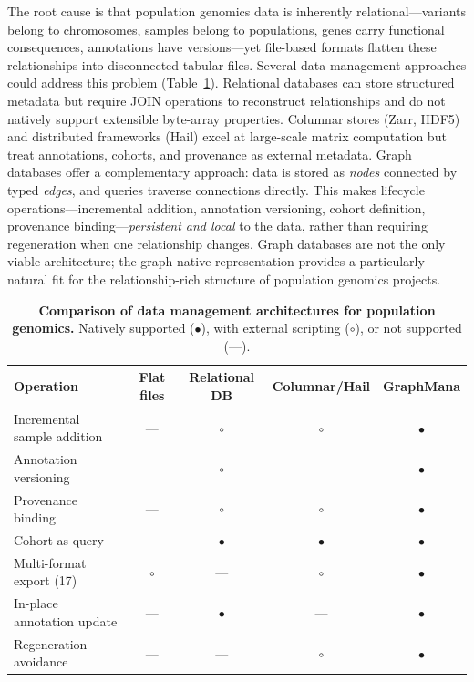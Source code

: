\documentclass[pdflatex,sn-nature]{sn-jnl}
\begin{document}
The root cause is that population genomics data is inherently relational---variants belong to chromosomes, samples belong to populations, genes carry functional consequences, annotations have versions---yet file-based formats flatten these relationships into disconnected tabular files. Several data management approaches could address this problem (Table~\ref{tab:architectures}). Relational databases can store structured metadata but require JOIN operations to reconstruct relationships and do not natively support extensible byte-array properties. Columnar stores (Zarr, HDF5) and distributed frameworks (Hail) excel at large-scale matrix computation but treat annotations, cohorts, and provenance as external metadata. Graph databases offer a complementary approach: data is stored as \textit{nodes} connected by typed \textit{edges}, and queries traverse connections directly. This makes lifecycle operations---incremental addition, annotation versioning, cohort definition, provenance binding---\textit{persistent and local} to the data, rather than requiring regeneration when one relationship changes. Graph databases are not the only viable architecture; the graph-native representation provides a particularly natural fit for the relationship-rich structure of population genomics projects.

\begin{table}[h]
\caption{\textbf{Comparison of data management architectures for population genomics.} Natively supported ($\bullet$), with external scripting ($\circ$), or not supported (---).}
\label{tab:architectures}
\begin{tabular}{@{}lcccc@{}}
\toprule
Operation & Flat files & Relational DB & Columnar/Hail & GraphMana \\
\midrule
Incremental sample addition & --- & $\circ$ & $\circ$ & $\bullet$ \\
Annotation versioning & --- & $\circ$ & --- & $\bullet$ \\
Provenance binding & --- & $\circ$ & $\circ$ & $\bullet$ \\
Cohort as query & --- & $\bullet$ & $\bullet$ & $\bullet$ \\
Multi-format export (17) & $\circ$ & --- & $\circ$ & $\bullet$ \\
In-place annotation update & --- & $\bullet$ & --- & $\bullet$ \\
Regeneration avoidance & --- & --- & $\circ$ & $\bullet$ \\
\bottomrule
\end{tabular}
\end{table}
\end{document}
